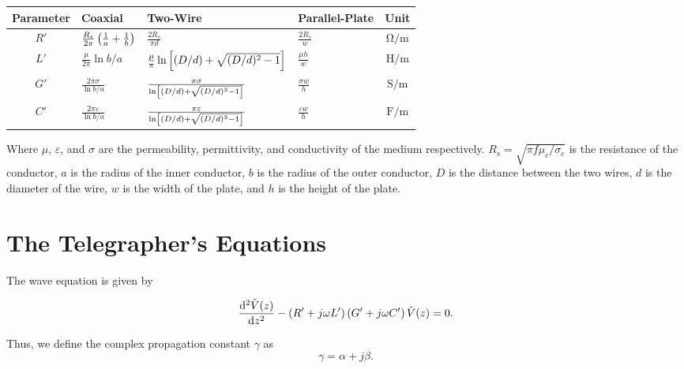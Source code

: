 \documentclass{report}
\begin{document}
{
\renewcommand{\arraystretch}{2.5}
\everymath{\displaystyle}
\begin{table}[H]
	\centering
	\begin{tabularx}{\linewidth}{|c|YYYc|}
		\hline
		\textbf{Parameter} & \textbf{Coaxial}                                       & \textbf{Two-Wire}                                             & \textbf{Parallel-Plate}   & \textbf{Unit}               \\
		\hline
		$R'$               & $\frac{R_s}{2\pi} \left( \frac{1}{a} + \frac{1}{b} \right)$ & $\frac{2R_s}{\pi d}$                                          & $\frac{2R_s}{w}$          & $\unit{\ohm\per\meter}$     \\
		$L'$               & $\frac{\mu}{2\pi}\ln b/a $                             & $\frac{\mu}{\pi}\ln\left[ (D/d)+\sqrt{(D/d)^2-1} \right]$          & $\frac{\mu h}{w}$         & $\unit{\henry\per\meter}$   \\
		$G'$               & $\frac{2\pi \sigma}{\ln b/a}$                          & $\frac{\pi \sigma}{\ln\left[ (D/d)+\sqrt{(D/d)^2-1} \right]}$      & $\frac{\sigma w}{h}$      & $\unit{\siemens\per\meter}$ \\
		$C'$               & $\frac{2\pi \varepsilon}{\ln b/a}$                     & $\frac{\pi \varepsilon}{\ln\left[ (D/d)+\sqrt{(D/d)^2-1} \right]}$ & $\frac{\varepsilon w}{h}$ & $\unit{\farad\per\meter}$   \\
		\hline
	\end{tabularx}
\end{table}
}
Where $\mu$, $\varepsilon$, and $\sigma$ are the permeability, permittivity, and conductivity of the medium respectively. $R_s=\sqrt{\pi f \mu_c/\sigma_c}$ is the resistance of the conductor, $a$ is the radius of the inner conductor, $b$ is the radius of the outer conductor, $D$ is the distance between the two wires, $d$ is the diameter of the wire, $w$ is the width of the plate, and $h$ is the height of the plate.\\

\section{The Telegrapher's Equations}

The wave equation is given by

\[
	\dv[2]{\tilde{V}(z)}{z} - \lt( R' + j\omega L' \rt) \lt( G' + j\omega C' \rt) \tilde{V}(z) = 0
	.\]

Thus, we define the complex propagation constant $\gamma$ as
\[
	\gamma = \alpha + j\beta
	.\]
\end{document}
